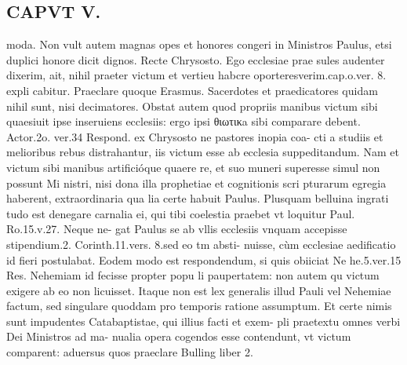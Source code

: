 \documentclass{article}
\begin{document}
\begin{pages}
\section*{CAPVT  V. }
\marginpar{[ p.307 ]}\pstart moda. Non vult autem magnas opes et honores congeri in Ministros Paulus, etsi duplici honore dicit dignos. Recte Chrysosto. Ego ecclesiae prae sules audenter dixerim, ait, nihil praeter victum et vertieu habcre oporteresverim.cap.o.ver. 8. expli cabitur. Praeclare quoque Erasmus. Sacerdotes et praedicatores quidam nihil sunt, nisi decimatores.  \pend\pstart Obstat autem quod propriis manibus victum sibi quaesiuit ipse inseruiens ecclesiis: ergo ipsi θιωτικa sibi comparare debent. Actor.2o. ver.34 Respond. ex Chrysosto ne pastores inopia coa- cti a studiis et melioribus rebus distrahantur, iis victum esse ab ecclesia suppeditandum. Nam et victum sibi manibus artificióque quaere re, et suo muneri superesse simul non possunt Mi nistri, nisi dona illa prophetiae et cognitionis scri pturarum egregia haberent, extraordinaria qua lia certe habuit Paulus. Plusquam belluina ingrati tudo est denegare carnalia ei, qui tibi coelestia praebet vt loquitur Paul. Ro.15.v.27. Neque ne- gat Paulus se ab vllis ecclesiis vnquam accepisse stipendium.2. Corinth.11.vers. 8.sed eo tm absti- nuisse, cùm ecclesiae aedificatio id fieri postulabat. Eodem modo est respondendum, si quis obiiciat Ne he.5.ver.15 Res. Nehemiam id fecisse propter popu li paupertatem: non autem qu victum exigere ab eo non licuisset. Itaque  non est lex generalis illud Pauli vel Nehemiae factum, sed singulare quoddam pro temporis ratione assumptum. Et certe nimis sunt impudentes Catabaptistae, qui illius facti et exem- pli praetextu omnes verbi Dei Ministros ad ma- nualia opera cogendos esse contendunt, vt victum comparent: aduersus quos praeclare Bulling liber 2.  \pend

\end{pages}
\end{document}
